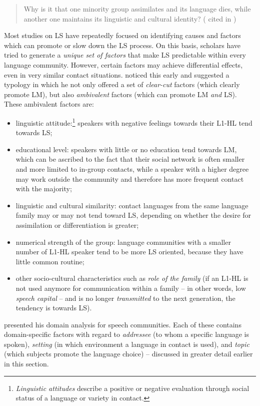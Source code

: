 \documentclass[output=paper]{langscibook}
\begin{document}
\begin{quote}
Why is it that one minority group assimilates and its language dies, while another one maintains its linguistic and cultural identity? (\citealt{Bradley2002} cited in \citealt[58]{Pauwels2016})
\end{quote}

\noindent Most studies on LS have repeatedly focused on identifying causes and factors which can promote or slow down the LS  process. On this basis, scholars have tried to generate a \emph{unique set of factors} that make LS predictable within every language community. However, certain factors may achieve differential effects, even in very similar contact situations. \textcite{Kloss1966}  noticed this early and suggested a typology in which he not only offered a set of \emph{clear-cut} factors (which clearly promote LM), but also \emph{ambivalent} factors (which can promote LM \emph{and} LS). These ambivalent factors are: 

\begin{itemize}
\item linguistic attitude:\footnote{\emph{Linguistic attitudes} describe a positive or negative evaluation through social status of a language or variety in contact.} speakers with negative feelings towards their L1-HL tend towards LS;
\item educational level: speakers with little or no education tend towards LM, which can be ascribed to the fact that their social network is often smaller and more limited to in-group contacts, while a speaker with a higher degree may work outside the community and therefore has more frequent contact with the majority;
\item linguistic and cultural similarity: contact languages from the same language family may or may not tend toward LS, depending on whether the desire for assimilation or differentiation is greater;
\item numerical strength of the group: language communities with a smaller number of L1-HL speaker tend to be more LS oriented, because they have little common routine; 
\item other socio-cultural characteristics such as \emph{role of the family} (if an L1-HL is not used anymore for communication within a family -- in other words, low \emph{speech capital} -- and is no longer \emph{transmitted} to the next generation, the tendency is towards LS).
\end{itemize}

\textcite{Fishman1972} presented his domain analysis for speech communities. Each of these contains domain-specific factors with regard to \emph{addressee} (to whom a specific language is spoken), \emph{setting} (in which environment a language in contact is used), and \emph{topic} (which subjects promote the language choice) -- discussed in greater detail earlier in this section. 
\end{document}
